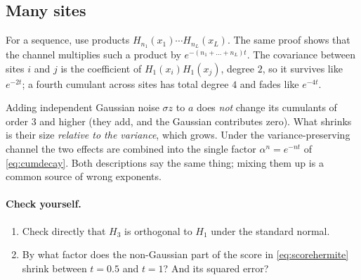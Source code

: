 \subsection{Many sites}

For a sequence, use products $H_{n_1}(x_1)\cdots H_{n_L}(x_L)$. The same proof shows that the channel multiplies
such a product by $e^{-(n_1+\dots+n_L)t}$. The covariance between sites $i$ and $j$ is the coefficient of
$H_1(x_i)H_1(x_j)$, degree $2$, so it survives like $e^{-2t}$; a fourth cumulant across sites has total degree
$4$ and fades like $e^{-4t}$.

\begin{caution}
Adding independent Gaussian noise $\sigma z$ to $a$ does \emph{not} change its cumulants of order $3$ and higher
(they add, and the Gaussian contributes zero). What shrinks is their size \emph{relative to the variance},
which grows. Under the variance-preserving channel the two effects are combined into the single factor
$\alpha^n=e^{-nt}$ of \eqref{eq:cumdecay}. Both descriptions say the same thing; mixing them up is a common
source of wrong exponents.
\end{caution}

\paragraph{Check yourself.}
\begin{enumerate}[label=\thesection.\arabic*,leftmargin=2.2em]
\item Check directly that $H_3$ is orthogonal to $H_1$ under the standard normal.
\item By what factor does the non-Gaussian part of the score in \eqref{eq:scorehermite} shrink between $t=0.5$ and $t=1$?
  And its squared error?
\end{enumerate}
